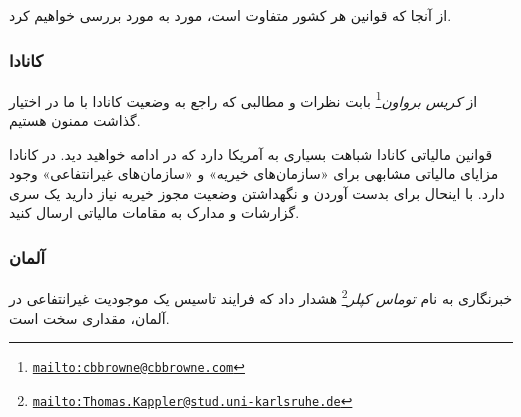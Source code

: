 از آنجا که قوانین هر کشور متفاوت است، مورد به مورد بررسی خواهیم کرد.
\subsubsection{کانادا}
از
\emph{کریس برواون}\footnote{\texttt{\url{mailto:cbbrowne@cbbrowne.com}}}
بابت نظرات و مطالبی که راجع به وضعیت کانادا با ما در اختیار گذاشت ممنون هستیم.


قوانین مالیاتی کانادا شباهت بسیاری به آمریکا دارد که در ادامه خواهید دید.
در کانادا مزایای مالیاتی مشابهی برای «سازمان‌های خیریه» و «سازمان‌های غیرانتفاعی»
وجود دارد. با اینحال برای بدست آوردن و نگهداشتن وضعیت مجوز خیریه نیاز دارید
یک سری گزارشات و مدارک به مقامات مالیاتی ارسال کنید.

\subsubsection{آلمان}

خبرنگاری به نام
\emph{توماس کپلر}\footnote{\texttt{\url{mailto:Thomas.Kappler@stud.uni-karlsruhe.de}}}
هشدار داد که فرایند تاسیس یک موجودیت غیرانتفاعی در آلمان، مقداری سخت است.

